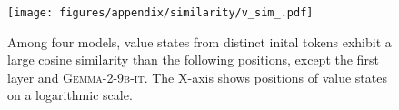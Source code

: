 \begin{figure}[ht]
    \centering
    \texttt{[image: figures/appendix/similarity/v\_sim\_.pdf]}
    \caption{Among four models, value states from distinct inital tokens exhibit a large cosine similarity than the following positions, except the first layer and \textsc{Gemma-2-9b-it}. The X-axis shows positions of value states on a logarithmic scale.} 
    \label{fig:app:sim:v}
\end{figure}